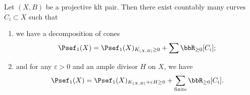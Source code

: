     \begin{theorem}\label{thm: cone theorem}
        Let \((X,B)\) be a projective klt pair.
        Then there exist countably many curves \(C_i \subset X\)
        such that
        \begin{enumerate}
            \item we have a decomposition of cones
            \[ \Psef_1(X) = \Psef_1(X)_{K_{(X,B)} \geq 0} + \sum \bbR_{\geq 0}[C_i]; \]
            \item and for any \(\varepsilon > 0\) and an ample divisor \(H\) on \(X\), we have
            \[ \Psef_1(X) = \Psef_1(X)_{K_{(X,B)}+\varepsilon H \geq 0} + \sum_{\text{finite}} \bbR_{\geq 0}[C_i]. \]
        \end{enumerate}
    \end{theorem}
